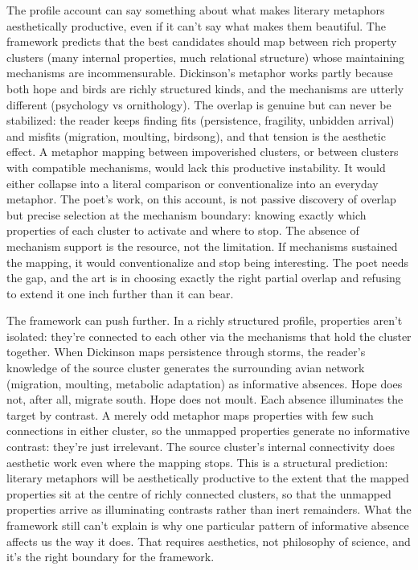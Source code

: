 \documentclass[12pt]{article}
\begin{document}
The profile account can say something about what makes literary metaphors aesthetically productive, even if it can't say what makes them beautiful. The framework predicts that the best candidates should map between rich property clusters (many internal properties, much relational structure) whose maintaining mechanisms are incommensurable. Dickinson's metaphor works partly because both hope and birds are richly structured kinds, and the mechanisms are utterly different (psychology vs ornithology). The overlap is genuine but can never be stabilized: the reader keeps finding fits (persistence, fragility, unbidden arrival) and misfits (migration, moulting, birdsong), and that tension is the aesthetic effect. A metaphor mapping between impoverished clusters, or between clusters with compatible mechanisms, would lack this productive instability. It would either collapse into a literal comparison or conventionalize into an everyday metaphor. The poet's work, on this account, is not passive discovery of overlap but precise selection at the mechanism boundary: knowing exactly which properties of each cluster to activate and where to stop. The absence of mechanism support is the resource, not the limitation. If mechanisms sustained the mapping, it would conventionalize and stop being interesting. The poet needs the gap, and the art is in choosing exactly the right partial overlap and refusing to extend it one inch further than it can bear.

The framework can push further. In a richly structured profile, properties aren't isolated: they're connected to each other via the mechanisms that hold the cluster together. When Dickinson maps persistence through storms, the reader's knowledge of the source cluster generates the surrounding avian network (migration, moulting, metabolic adaptation) as informative absences. Hope does not, after all, migrate south. Hope does not moult. Each absence illuminates the target by contrast. A merely odd metaphor maps properties with few such connections in either cluster, so the unmapped properties generate no informative contrast: they're just irrelevant. The source cluster's internal connectivity does aesthetic work even where the mapping stops. This is a structural prediction: literary metaphors will be aesthetically productive to the extent that the mapped properties sit at the centre of richly connected clusters, so that the unmapped properties arrive as illuminating contrasts rather than inert remainders. What the framework still can't explain is why one particular pattern of informative absence affects us the way it does. That requires aesthetics, not philosophy of science, and it's the right boundary for the framework.
\end{document}
